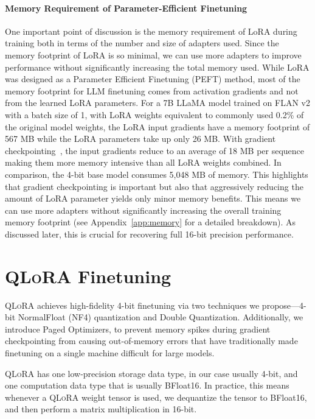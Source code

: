 \paragraph{Memory Requirement of Parameter-Efficient Finetuning} One important point of discussion is the memory requirement of LoRA during training both in terms of the number and size of adapters used. Since the memory footprint of LoRA is so minimal, we can use more adapters to improve performance without significantly increasing the total memory used. While LoRA was designed as a Parameter Efficient Finetuning (PEFT) method, most of the memory footprint for LLM finetuning comes from activation gradients and not from the learned LoRA parameters. For a 7B LLaMA model trained on FLAN v2 with a batch size of 1, with LoRA weights equivalent to commonly used 0.2\% of the original model weights\citep{hu2021lora,liu2022few}, the LoRA input gradients have a memory footprint of 567 MB while the LoRA parameters take up only 26 MB. With gradient checkpointing~\citep{chen2016training}, the input gradients reduce to an average of 18 MB per sequence making them more memory intensive than all LoRA weights combined. In comparison, the 4-bit base model consumes 5,048 MB of memory. This highlights that gradient checkpointing is important but also that aggressively reducing the amount of LoRA parameter yields only minor memory benefits. This means we can use more adapters without significantly increasing the overall training memory footprint (see Appendix~\ref{app:memory} for a detailed breakdown). As discussed later, this is crucial for recovering full 16-bit precision performance.

\section{\textsc{QLoRA} Finetuning}

\textsc{QLoRA} achieves high-fidelity 4-bit finetuning via two techniques we propose—4-bit NormalFloat (NF4) quantization and Double Quantization. Additionally, we introduce Paged Optimizers, to prevent memory spikes during gradient checkpointing from causing out-of-memory errors that have traditionally made finetuning on a single machine difficult for large models.

\textsc{QLoRA} has one low-precision storage data type, in our case usually 4-bit, and one computation data type that is usually BFloat16. In practice, this means whenever a \textsc{QLoRA} weight tensor is used, we dequantize the tensor to BFloat16, and then perform a matrix multiplication in 16-bit. 

